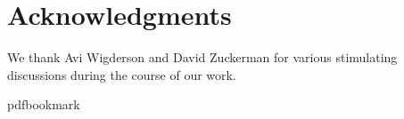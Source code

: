 \documentclass[11pt]{article}
\numberwithin{equation}{section}
\theoremstyle{definition}
\theoremstyle{plain}
\begin{document}
\section*{Acknowledgments}
We thank Avi Wigderson and David Zuckerman for various stimulating discussions during the course of our work.

\providecommand{\bibhead}[1]{}
\expandafter\ifx\csname pdfbookmark\endcsname\relax%
  \providecommand{\tocrefpdfbookmark}{}
\else\providecommand{\tocrefpdfbookmark}{%
   \hypertarget{tocreferences}{}%
   \pdfbookmark[1]{References}{tocreferences}}%
\fi
\end{document}
